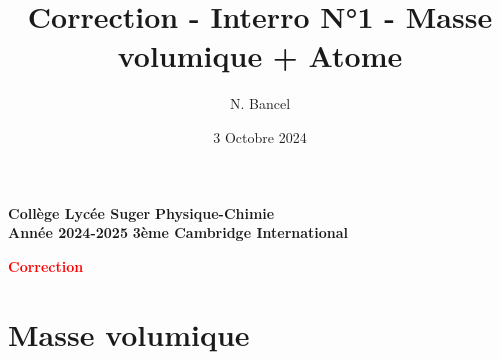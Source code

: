 \documentclass{exam}
\title{Correction - Interro N°1 - Masse volumique + Atome}
\author{N. Bancel}
\date{3 Octobre 2024}
\begin{document}
\textbf{Collège Lycée Suger}
\hfill
\textbf{Physique-Chimie} \\

\textbf{Année 2024-2025}
\hfill
\textbf{3ème Cambridge International} \par

{\let\newpage\relax\maketitle}

\begin{center}
\textbf{\textcolor{red}{Correction}}
\end{center}

\section*{Masse volumique}
\end{document}
